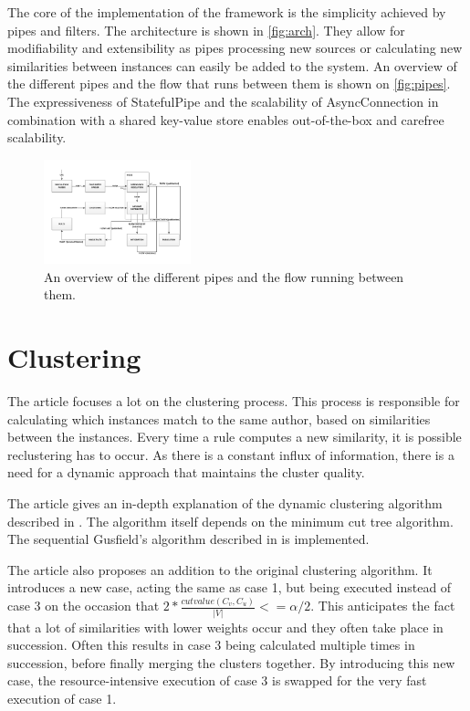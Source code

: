 \documentclass[9pt, twocolumn]{phdsymp} %
\begin{document}
The core of the implementation of the framework is the simplicity achieved by pipes and filters. The architecture is shown in \autoref{fig:arch}. They allow for modifiability and extensibility as pipes processing new sources or calculating new similarities between instances can easily be added to the system. An overview of the different pipes and the flow that runs between them is shown on \autoref{fig:pipes}. The expressiveness of StatefulPipe and the scalability of AsyncConnection in combination with a shared key-value store enables out-of-the-box and carefree scalability.

\begin{figure}[hb!]
	\centering
	\includegraphics[width= 0.38\textwidth]{fig/completepipesmall.pdf}
	\caption{An overview of the different pipes and the flow running between them.}
	\label{fig:pipes}
\end{figure}

\section{Clustering}

The article focuses a lot on the clustering process. This process is responsible for calculating which instances match to the same author, based on similarities between the instances. Every time a rule computes a new similarity, it is possible reclustering has to occur. As there is a constant influx of information, there is a need for a dynamic approach that maintains the cluster quality. 

The article gives an in-depth explanation of the dynamic clustering algorithm described in \cite{dynamic}. The algorithm itself depends on the minimum cut tree algorithm. The sequential Gusfield's algorithm described in \cite{gusfield} is implemented. 

The article also proposes an addition to the original clustering algorithm. It introduces a new case, acting the same as case 1, but being executed instead of case 3 on the occasion that $2 * \frac{cutvalue(C_v, C_u)}{\left|V\right|} <= \alpha / 2$. This anticipates the fact that a lot of similarities with lower weights occur and they often take place in succession. Often this results in case 3 being calculated multiple times in succession, before finally merging the clusters together. By introducing this new case, the resource-intensive execution of case 3 is swapped for the very fast execution of case 1.
\end{document}
